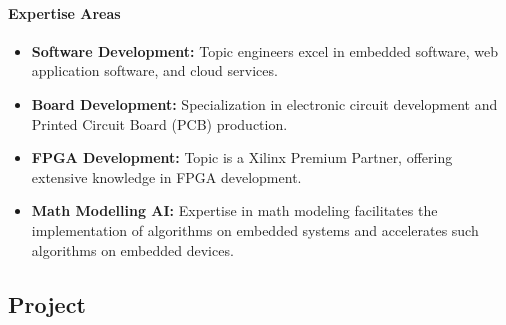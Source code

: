 \documentclass{article}
\begin{document}
\paragraph{Expertise Areas} 
\begin{itemize} 
    \item \textbf{Software Development:}
Topic engineers excel in embedded software, web application software, and cloud
services. 
\item \textbf{Board Development:} Specialization in electronic circuit
development and Printed Circuit Board (PCB) production. 
\item \textbf{FPGA Development:} Topic is a Xilinx Premium Partner, offering extensive knowledge in
FPGA development. 
\item \textbf{Math Modelling AI:} Expertise in math modeling
facilitates the implementation of algorithms on embedded systems and accelerates
such algorithms on embedded devices. 
\end{itemize}

\subsection{Project}\label{project-background}

\end{document}
